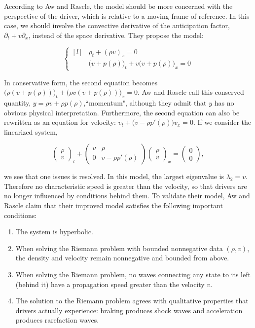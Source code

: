 \documentclass{article}
\begin{document}
According to Aw and Rascle, the model should be more concerned with the perspective of the driver, which is relative to a moving frame of reference.  In this case, we should involve the convective derivative of the anticipation factor, $\partial_t + v \partial_x$, instead of the space derivative.  They propose the model:

\[ \left\{ \begin{matrix*}[l] & \rho_t + (\rho v)_x = 0 \\[1ex] & \Big(v + p(\rho)\Big)_t + v \Big(v + p(\rho)\Big)_x = 0 \end{matrix*} \right. \]

In conservative form, the second equation becomes $\Big( \rho (v + p(\rho)) \Big)_t + \Big( \rho v (v + p(\rho)) \Big)_x = 0$.  Aw and Rascle call this conserved quantity, $y = \rho v + \rho p(\rho)$,``momentum", although they admit that $y$ has no obvious physical interpretation. Furthermore, the second equation can also be rewritten as an equation for velocity: $v_t + \Big(v - \rho p'(\rho)\Big)v_x = 0$. If we consider the linearized system,

\[ \begin{pmatrix} \rho \\[1ex] v \end{pmatrix}_t + \begin{pmatrix} v & \rho \\[1ex] 0 & v - \rho p'(\rho) \end{pmatrix} \begin{pmatrix} \rho \\[1ex] v \end{pmatrix}_x = \begin{pmatrix} 0 \\[1ex] 0 \end{pmatrix}, \]

we see that one issues is resolved.  In this model, the largest eigenvalue is $\lambda_2 = v$.  Therefore no characteristic speed is greater than the velocity, so that drivers are no longer influenced by conditions behind them. To validate their model, Aw and Rascle claim that their improved model satisfies the following important conditions:
\begin{enumerate}
\item The system is hyperbolic.
\item When solving the Riemann problem with bounded nonnegative data $(\rho, v)$, the density and velocity remain nonnegative and bounded from above.
\item When solving the Riemann problem, no waves connecting any state to its left (behind it) have a propagation speed greater than the velocity $v$.
\item The solution to the Riemann problem agrees with qualitative properties that drivers actually experience: braking produces shock waves and acceleration produces rarefaction waves.
\end{enumerate}
\end{document}
